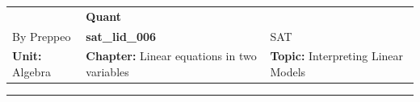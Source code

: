 \documentclass[11pt,paper=a4,answers]{exam}
\begin{document}
\begin{center}
    \centering
    \renewcommand{\arraystretch}{1.5}
    \begin{tabularx}{\textwidth}{YYY}
    & \normalsize\bf{{\Large{{Quant}}}} & \\
    By Preppeo & \normalsize\bf{{sat\_lid\_006}} & SAT\\
    \normalsize{{\textbf{{Unit:}} Algebra}} & \normalsize{{\textbf{{Chapter:}} Linear equations in two variables}} & \normalsize{{\textbf{{Topic:}} Interpreting Linear Models}} \\
    \end{tabularx}
\end{center}
\par\noindent\rule{\textwidth}{1pt}
\end{document}

